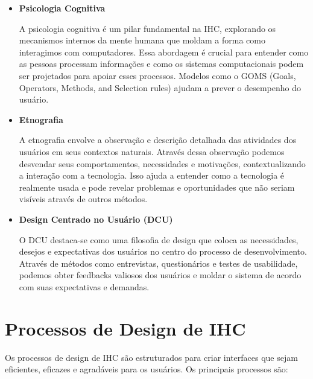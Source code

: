 \documentclass[
  12pt,
  openright,
  twoside,
  a4paper,
  english,
  french,
  spanish,
  brazil
]{abntex2}
\begin{document}
\begin{itemize}
  \item \textbf{Psicologia Cognitiva}

    A psicologia cognitiva é um pilar fundamental na IHC, explorando os
    mecanismos internos da mente humana que moldam a forma como interagimos com
    computadores. Essa abordagem é crucial para entender como as pessoas
    processam informações e como os sistemas computacionais podem ser projetados
    para apoiar esses processos. Modelos como o GOMS (Goals, Operators, Methods,
    and Selection rules) ajudam a prever o desempenho do usuário.

  \item \textbf{Etnografia}

    A etnografia envolve a observação e descrição detalhada das atividades dos
    usuários em seus contextos naturais. Através dessa observação podemos
    desvendar seus comportamentos, necessidades e motivações, contextualizando a
    interação com a tecnologia. Isso ajuda a entender como a tecnologia é
    realmente usada e pode revelar problemas e oportunidades que não seriam
    visíveis através de outros métodos.

  \newpage

  \item \textbf{Design Centrado no Usuário (DCU)}

    O DCU destaca-se como uma filosofia de design que coloca as necessidades,
    desejos e expectativas dos usuários no centro do processo de
    desenvolvimento. Através de métodos como entrevistas, questionários e testes
    de usabilidade, podemos obter feedbacks valiosos dos usuários e moldar o
    sistema de acordo com suas expectativas e demandas.
\end{itemize}

\section{Processos de Design de IHC}

Os processos de design de IHC são estruturados para criar interfaces que sejam
eficientes, eficazes e agradáveis para os usuários. Os principais processos são:
\end{document}
